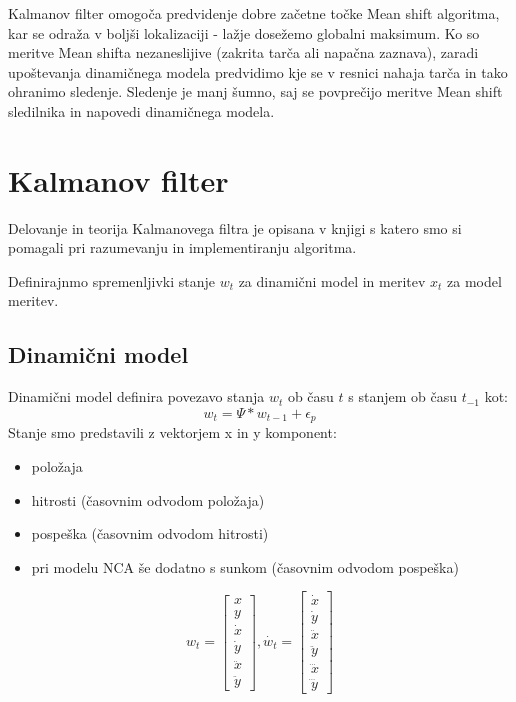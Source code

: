 \documentclass[a4paper]{article}
\begin{document}
Kalmanov filter omogoča predvidenje dobre začetne točke Mean shift algoritma, kar se odraža v boljši lokalizaciji - lažje dosežemo globalni maksimum. Ko so meritve Mean shifta nezaneslijive (zakrita tarča ali napačna zaznava), zaradi upoštevanja dinamičnega modela predvidimo kje se v resnici nahaja tarča in tako ohranimo sledenje. Sledenje je manj šumno, saj se povprečijo meritve Mean shift sledilnika in napovedi dinamičnega modela. 

\section{Kalmanov filter}
Delovanje in teorija Kalmanovega filtra je opisana v knjigi \cite{prince} s katero smo si pomagali pri razumevanju in implementiranju algoritma. 

Definirajnmo spremenljivki stanje $w_t$ za dinamični model in meritev $x_t$ za model meritev.
\subsection{Dinamični model} 
Dinamični model definira povezavo stanja $w_t$ ob času $t$ s stanjem ob času $t_{-1}$ kot: $$w_t = \Psi*w_{t-1} + \epsilon_p$$ 
Stanje smo predstavili z vektorjem x in y komponent:
\begin{itemize}
	\item položaja
	\item hitrosti (časovnim odvodom položaja) 
	\item pospeška (časovnim odvodom hitrosti) 
	\item pri modelu NCA še dodatno s sunkom (časovnim odvodom pospeška)
\end{itemize}

$$
w_t=
\begin{bmatrix}
	x\\y\\\dot{x}\\\dot{y}\\\ddot{x}\\\ddot{y}
\end{bmatrix}
,\dot{w_t}=
\begin{bmatrix}
	\dot{x}\\\dot{y}\\\ddot{x}\\\ddot{y}\\\dddot{x}\\\dddot{y}
\end{bmatrix}
$$
\end{document}
